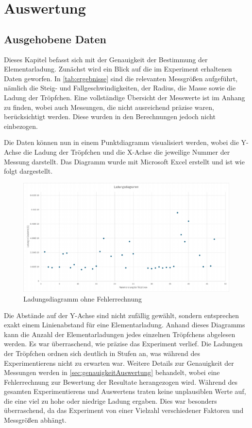 \chapter{Auswertung}\label{cha:auswertung}
\section{Ausgehobene Daten}\label{sec:aushebungDaten}
Dieses Kapitel befasst sich mit der Genauigkeit der Bestimmung der Elementarladung. Zunächst wird ein Blick auf die im Experiment erhaltenen Daten geworfen. In \autoref{tab:ergebnisse} sind die relevanten Messgrößen aufgeführt, nämlich die Steig- und Fallgeschwindigkeiten, der Radius, die Masse sowie die Ladung der Tröpfchen. Eine vollständige Übersicht der Messwerte ist im Anhang zu finden, wobei auch Messungen, die nicht ausreichend präzise waren, berücksichtigt werden. Diese wurden in den Berechnungen jedoch nicht einbezogen.

Die Daten können nun in einem Punktdiagramm visualisiert werden, wobei die Y-Achse die Ladung der Tröpfchen und die X-Achse die jeweilige Nummer der Messung darstellt. Das Diagramm wurde mit Microsoft Excel erstellt und ist wie folgt dargestellt.

\begin{figure}[h]
	\centering
	\includegraphics[width=\textwidth]{bilder/pdf/LadungsdiagrammOhne.pdf}
	\caption{Ladungsdiagramm ohne Fehlerrechnung}
	\label{fig:ladungsdiagrammOFehlerrechnung}
\end{figure}

\noindent Die Abstände auf der Y-Achse sind nicht zufällig gewählt, sondern entsprechen exakt einem Linienabstand für eine Elementarladung. Anhand dieses Diagramms kann die Anzahl der Elementarladungen jedes einzelnen Tröpfchens abgelesen werden. Es war überraschend, wie präzise das Experiment verlief. Die Ladungen der Tröpfchen ordnen sich deutlich in Stufen an, was während des Experimentierens nicht zu erwarten war. Weitere Details zur Genauigkeit der Messungen werden in \autoref{sec:genauigkeitAuswertung} behandelt, wobei eine Fehlerrechnung zur Bewertung der Resultate herangezogen wird. Während des gesamten Experimentierens und Auswertens traten keine unplausiblen Werte auf, die eine viel zu hohe oder niedrige Ladung ergaben. Dies war besonders überraschend, da das Experiment von einer Vielzahl verschiedener Faktoren und Messgrößen abhängt.

